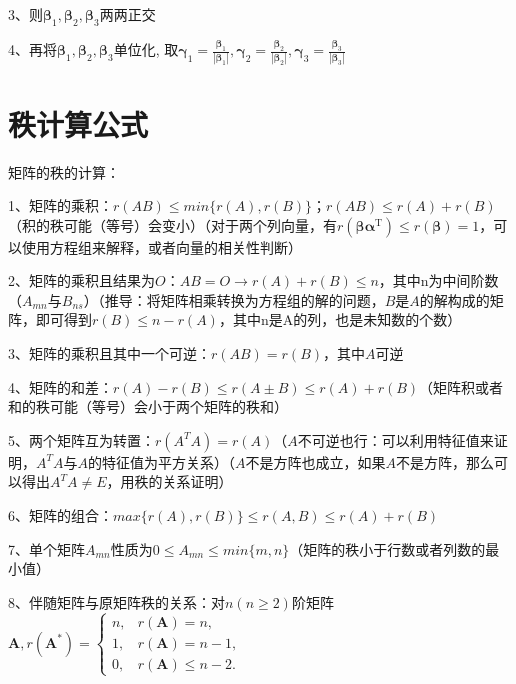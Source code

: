 3、则$\boldsymbol{\beta}_{1}, \boldsymbol{\beta}_{2}, \boldsymbol{\beta}_{3}$两两正交

4、再将$\boldsymbol{\beta}_{1}, \boldsymbol{\beta}_{2}, \boldsymbol{\beta}_{3}$单位化, 取$\boldsymbol{\gamma}_{1}=\frac{\boldsymbol{\beta}_{1}}{\left|\boldsymbol{\beta}_{1}\right|}, \boldsymbol{\gamma}_{2}=\frac{\boldsymbol{\beta}_{2}}{\left|\boldsymbol{\beta}_{2}\right|}, \boldsymbol{\gamma}_{3}=\frac{\boldsymbol{\beta}_{3}}{\left|\boldsymbol{\beta}_{3}\right|}$

\section{秩计算公式}

矩阵的秩的计算：

1、矩阵的乘积：$r(AB) \leqslant min\{r(A),r(B)\}$；$r(AB) \leqslant r(A)+r(B)$（积的秩可能（等号）会变小）（对于两个列向量，有$r\left(\boldsymbol{\beta} \boldsymbol{\alpha}^{\mathrm{T}}\right) \leqslant r(\boldsymbol{\beta})=1$，可以使用方程组来解释，或者向量的相关性判断）

2、矩阵的乘积且结果为$O$：$AB=O \rightarrow r(A)+r(B) \leqslant n$，其中n为中间阶数（$A_{mn}$与$B_{ns}$）（推导：将矩阵相乘转换为方程组的解的问题，$B$是$A$的解构成的矩阵，即可得到$r(B)\leqslant n - r(A) $，其中n是A的列，也是未知数的个数）

3、矩阵的乘积且其中一个可逆：$r(AB)=r(B)$，其中$A$可逆

4、矩阵的和差：$r(A)-r(B)\leqslant r(A\pm B) \leqslant r(A)+r(B)$（矩阵积或者和的秩可能（等号）会小于两个矩阵的秩和）

5、两个矩阵互为转置：$r(A^TA)= r(A)$（$A$不可逆也行：可以利用特征值来证明，$A^TA$与$A$的特征值为平方关系）（$A$不是方阵也成立，如果$A$不是方阵，那么可以得出$A^TA \ne E$，用秩的关系证明）

6、矩阵的组合：$max\{r(A),r(B)\}  \leqslant r(A,B) \leqslant r(A)+r(B)$

7、单个矩阵$A_{mn}$性质为$0 \leqslant A_{mn} \leqslant min\{ m,n \}$（矩阵的秩小于行数或者列数的最小值）

8、伴随矩阵与原矩阵秩的关系：对$n(n \geqslant 2)$阶矩阵$\boldsymbol{A}, r\left(\boldsymbol{A}^{*}\right)= \begin{cases}n, & r(\boldsymbol{A})=n, \\ 1, & r(\boldsymbol{A})=n-1, \\ 0, & r(\boldsymbol{A}) \leqslant n-2 .\end{cases}$

